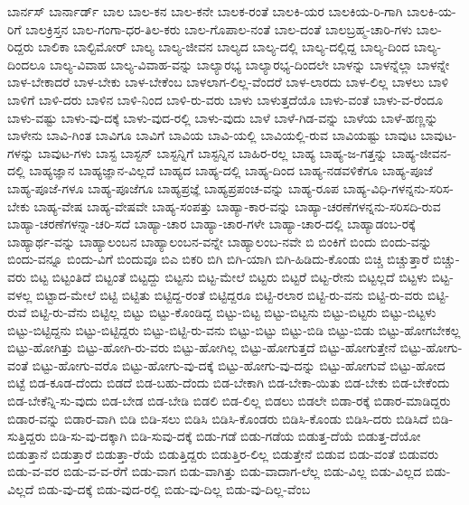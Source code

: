 {ಬಾರ್ನಸ್
ಬಾರ್ನಾರ್ಡ್
ಬಾಲ
ಬಾಲ-ಕನ
ಬಾಲ-ಕನೇ
ಬಾಲಕ-ರಂತೆ
ಬಾಲಕಿ-ಯರ
ಬಾಲಕಿಯ-ರಿ-ಗಾಗಿ
ಬಾಲಕಿ-ಯ-ರಿಗೆ
ಬಾಲಕ್ರಿಸ್ತನ
ಬಾಲ-ಗಂಗಾ-ಧರ-ತಿಲ-ಕರು
ಬಾಲ-ಗೊಪಾಲ-ನಂತೆ
ಬಾಲ-ದಂತೆ
ಬಾಲಬ್ರಹ್ಮ-ಚಾರಿ-ಗಳು
ಬಾಲ-ರಿದ್ದರು
ಬಾಲಿಕಾ
ಬಾಲ್ಟಿಮೋರ್
ಬಾಲ್ಯ
ಬಾಲ್ಯ-ಜೀವನ
ಬಾಲ್ಯದ
ಬಾಲ್ಯ-ದಲ್ಲಿ
ಬಾಲ್ಯ-ದಲ್ಲಿದ್ದ
ಬಾಲ್ಯ-ದಿಂದ
ಬಾಲ್ಯ-ದಿಂದಲೂ
ಬಾಲ್ಯ-ವಿವಾಹ
ಬಾಲ್ಯ-ವಿವಾಹ-ವನ್ನು
ಬಾಲ್ಯಾರಭ್ಯ
ಬಾಲ್ಯಾರಭ್ಯ-ದಿಂದಲೇ
ಬಾಳನ್ನು
ಬಾಳನ್ನೆಲ್ಲಾ
ಬಾಳನ್ನೇ
ಬಾಳ-ಬೇಕಾದರೆ
ಬಾಳ-ಬೇಕು
ಬಾಳ-ಬೇಕೆಂಬ
ಬಾಳಲಾಗ-ಲಿಲ್ಲ-ವೆಂದರೆ
ಬಾಳ-ಲಾರದು
ಬಾಳ-ಲಿಲ್ಲ
ಬಾಳಲು
ಬಾಳಿ
ಬಾಳಿಗೆ
ಬಾಳಿ-ದರು
ಬಾಳಿನ
ಬಾಳಿ-ನಿಂದ
ಬಾಳಿ-ರು-ವರು
ಬಾಳು
ಬಾಳುತ್ತದೆಯೊ
ಬಾಳು-ವಂತೆ
ಬಾಳು-ವ-ರೆಂದೂ
ಬಾಳು-ವಷ್ಟು
ಬಾಳು-ವು-ದಕ್ಕೆ
ಬಾಳು-ವುದ-ರಲ್ಲಿ
ಬಾಳು-ವುದು
ಬಾಳೆ
ಬಾಳೆ-ಗಿಡ-ವನ್ನು
ಬಾಳೆಯ
ಬಾಳೆ-ಹಣ್ಣನ್ನು
ಬಾಳೇನು
ಬಾವಿ-ಗಿಂತ
ಬಾವಿಗೂ
ಬಾವಿಗೆ
ಬಾವಿಯ
ಬಾವಿ-ಯಲ್ಲಿ
ಬಾವಿಯಲ್ಲಿ-ರುವ
ಬಾವಿಯಷ್ಟು
ಬಾವುಟ
ಬಾವುಟ-ಗಳನ್ನು
ಬಾವುಟ-ಗಳು
ಬಾಸ್ಟ
ಬಾಸ್ಟನ್
ಬಾಸ್ಟನ್ನಿಗೆ
ಬಾಸ್ಟನ್ನಿನ
ಬಾಹಿರ-ರಲ್ಲ
ಬಾಹ್ಯ
ಬಾಹ್ಯ-ಜ-ಗತ್ತನ್ನು
ಬಾಹ್ಯ-ಜೀವನ-ದಲ್ಲಿ
ಬಾಹ್ಯಜ್ಞಾನ
ಬಾಹ್ಯಜ್ಞಾನ-ವಿಲ್ಲದೆ
ಬಾಹ್ಯದ
ಬಾಹ್ಯ-ದಲ್ಲಿ
ಬಾಹ್ಯ-ದಿಂದ
ಬಾಹ್ಯ-ನಡವಳಿಕೆಗೂ
ಬಾಹ್ಯ-ಪೂಜೆ
ಬಾಹ್ಯ-ಪೂಜೆ-ಗಳೂ
ಬಾಹ್ಯ-ಪೂಜೆಗೂ
ಬಾಹ್ಯಪ್ರಜ್ಞೆ
ಬಾಹ್ಯಪ್ರಪಂಚ-ವನ್ನು
ಬಾಹ್ಯ-ರೂಪ
ಬಾಹ್ಯ-ವಿಧಿ-ಗಳನ್ನನು-ಸರಿಸ-ಬೇಕು
ಬಾಹ್ಯ-ವೇಷ
ಬಾಹ್ಯ-ವೇಷವೇ
ಬಾಹ್ಯ-ಸಂಪತ್ತು
ಬಾಹ್ಯಾ-ಕಾರ-ವನ್ನು
ಬಾಹ್ಯಾ-ಚರಣೆಗಳನ್ನನು-ಸರಿಸದಿ-ರುವ
ಬಾಹ್ಯಾ-ಚರಣೆಗಳನ್ನಾ-ಚರಿ-ಸದೆ
ಬಾಹ್ಯಾ-ಚಾರ
ಬಾಹ್ಯಾ-ಚಾರ-ಗಳೇ
ಬಾಹ್ಯಾ-ಚಾರ-ದಲ್ಲಿ
ಬಾಹ್ಯಾಡಂಬ-ರಕ್ಕೆ
ಬಾಹ್ಯಾರ್ಥ-ವನ್ನು
ಬಾಹ್ಯಾಲಂಬನ
ಬಾಹ್ಯಾಲಂಬನ-ವನ್ನೇ
ಬಾಹ್ಯಾಲಂಬ-ನವೇ
ಬಿ
ಬಿಂಕಿಗೆ
ಬಿಂದು
ಬಿಂದು-ವನ್ನು
ಬಿಂದು-ವನ್ನೂ
ಬಿಂದು-ವಿಗೆ
ಬಿಂದುವೂ
ಬಿಎ
ಬಿಕರಿ
ಬಿಗಿ
ಬಿಗಿ-ಯಾಗಿ
ಬಿಗಿ-ಹಿಡಿದು-ಕೊಂಡು
ಬಿಚ್ಚಿ
ಬಿಚ್ಚುತ್ತಾರೆ
ಬಿಚ್ಚು-ವರು
ಬಿಟ್ಟ
ಬಿಟ್ಟಂತಿದೆ
ಬಿಟ್ಟಂತೆ
ಬಿಟ್ಟದ್ದು
ಬಿಟ್ಟನು
ಬಿಟ್ಟ-ಮೇಲೆ
ಬಿಟ್ಟರು
ಬಿಟ್ಟರೆ
ಬಿಟ್ಟ-ರೇನು
ಬಿಟ್ಟಲ್ಲದೆ
ಬಿಟ್ಟಳು
ಬಿಟ್ಟ-ವಳಲ್ಲ
ಬಿಟ್ಟಾದ-ಮೇಲೆ
ಬಿಟ್ಟಿ
ಬಿಟ್ಟಿತು
ಬಿಟ್ಟಿದ್ದ-ರಂತೆ
ಬಿಟ್ಟಿದ್ದರೂ
ಬಿಟ್ಟಿ-ರಲಾರ
ಬಿಟ್ಟಿ-ರು-ವನು
ಬಿಟ್ಟಿ-ರು-ವರು
ಬಿಟ್ಟಿ-ರುವೆ
ಬಿಟ್ಟಿ-ರು-ವೆನು
ಬಿಟ್ಟಿಲ್ಲ
ಬಿಟ್ಟು
ಬಿಟ್ಟು-ಕೊಂಡಿದ್ದ
ಬಿಟ್ಟು-ಬಿಟ್ಟ
ಬಿಟ್ಟು-ಬಿಟ್ಟನು
ಬಿಟ್ಟು-ಬಿಟ್ಟರು
ಬಿಟ್ಟು-ಬಿಟ್ಟಳು
ಬಿಟ್ಟು-ಬಿಟ್ಟಿದ್ದನು
ಬಿಟ್ಟು-ಬಿಟ್ಟಿದ್ದರು
ಬಿಟ್ಟು-ಬಿಟ್ಟಿ-ರು-ವನು
ಬಿಟ್ಟು-ಬಿಟ್ಟು
ಬಿಟ್ಟು-ಬಿಡಿ
ಬಿಟ್ಟು-ಬಿಡು
ಬಿಟ್ಟು-ಹೋಗಬೇಕಲ್ಲ
ಬಿಟ್ಟು-ಹೋಗಿತ್ತು
ಬಿಟ್ಟು-ಹೋಗಿ-ರು-ವರು
ಬಿಟ್ಟು-ಹೋಗಿಲ್ಲ
ಬಿಟ್ಟು-ಹೋಗುತ್ತದೆ
ಬಿಟ್ಟು-ಹೋಗುತ್ತೇನೆ
ಬಿಟ್ಟು-ಹೋಗು-ವಂತೆ
ಬಿಟ್ಟು-ಹೋಗು-ವರೊ
ಬಿಟ್ಟು-ಹೋಗು-ವು-ದಕ್ಕೆ
ಬಿಟ್ಟು-ಹೋಗು-ವು-ದನ್ನು
ಬಿಟ್ಟು-ಹೋಗುವೆ
ಬಿಟ್ಟು-ಹೋದ
ಬಿಟ್ಟೆ
ಬಿಡ-ಕೂಡ-ದೆಂದು
ಬಿಡದೆ
ಬಿಡ-ಬಹು-ದೆಂದು
ಬಿಡ-ಬೇಕಾಗಿ
ಬಿಡ-ಬೇಕಾ-ಯಿತು
ಬಿಡ-ಬೇಕು
ಬಿಡ-ಬೇಕೆಂದು
ಬಿಡ-ಬೇಕೆನ್ನಿ-ಸು-ವುದು
ಬಿಡ-ಬೇಡ
ಬಿಡ-ಬೇಡಿ
ಬಿಡಲಿ
ಬಿಡ-ಲಿಲ್ಲ
ಬಿಡಲು
ಬಿಡಲೇ
ಬಿಡಾ-ರಕ್ಕೆ
ಬಿಡಾರ-ಮಾಡಿದ್ದರು
ಬಿಡಾರ-ವನ್ನು
ಬಿಡಾರ-ವಾಗಿ
ಬಿಡಿ
ಬಿಡಿ-ಸಲು
ಬಿಡಿಸಿ
ಬಿಡಿಸಿ-ಕೊಂಡರು
ಬಿಡಿಸಿ-ಕೊಂಡು
ಬಿಡಿಸಿ-ದರು
ಬಿಡಿಸಿದೆ
ಬಿಡಿ-ಸುತ್ತಿದ್ದರು
ಬಿಡಿ-ಸು-ವು-ದಕ್ಕಾಗಿ
ಬಿಡಿ-ಸುವು-ದಕ್ಕೆ
ಬಿಡು-ಗಡೆ
ಬಿಡು-ಗಡೆಯ
ಬಿಡುತ್ತ-ದೆಯೆ
ಬಿಡುತ್ತ-ದೆಯೋ
ಬಿಡುತ್ತಾನೆ
ಬಿಡುತ್ತಾರೆ
ಬಿಡುತ್ತಾ-ರೆಯೆ
ಬಿಡುತ್ತಿದ್ದರು
ಬಿಡುತ್ತಿರ-ಲಿಲ್ಲ
ಬಿಡುತ್ತೇನೆ
ಬಿಡುವ
ಬಿಡು-ವಂತೆ
ಬಿಡುವರು
ಬಿಡು-ವ-ವರ
ಬಿಡು-ವ-ವ-ರೆಗೆ
ಬಿಡು-ವಾಗ
ಬಿಡು-ವಾಗಿತ್ತು
ಬಿಡು-ವಾದಾಗ-ಲೆಲ್ಲ
ಬಿಡು-ವಿಲ್ಲ
ಬಿಡು-ವಿಲ್ಲದ
ಬಿಡು-ವಿಲ್ಲದೆ
ಬಿಡು-ವು-ದಕ್ಕೆ
ಬಿಡು-ವುದ-ರಲ್ಲಿ
ಬಿಡು-ವು-ದಿಲ್ಲ
ಬಿಡು-ವು-ದಿಲ್ಲ-ವೆಂಬ
}
